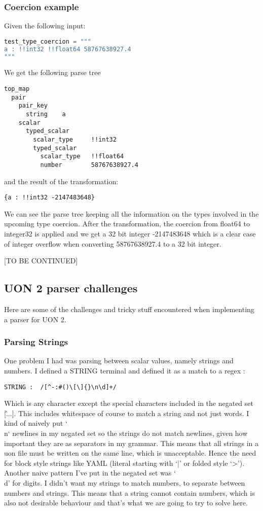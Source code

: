 \documentclass[12pt]{article}
\begin{document}
\subsubsection{Coercion example}
Given the following input:
\begin{lstlisting}[language=Python]
test_type_coercion = """
a : !!int32 !!float64 58767638927.4
"""
\end{lstlisting}

We get the following parse tree
\begin{lstlisting}
top_map
  pair
    pair_key
      string    a
    scalar
      typed_scalar
        scalar_type     !!int32
        typed_scalar
          scalar_type   !!float64
          number        58767638927.4
\end{lstlisting}

and the result of the transformation:
\begin{lstlisting}
{a : !!int32 -2147483648}
\end{lstlisting}
We can see the parse tree keeping all the information on the types involved in the upcoming type coercion. After the transformation, the coercion from float64 to integer32 is applied and we get a 32 bit integer -2147483648 which is a clear case of integer overflow when converting 58767638927.4 to a 32 bit integer.

[TO BE CONTINUED]

\subsection{UON 2 parser challenges}
Here are some of the challenges and tricky stuff encountered when implementing a parser for UON 2.

\subsubsection{Parsing Strings}
One problem I had was parsing between scalar values, namely strings and numbers.
I defined a STRING terminal and defined it as a match to a regex :
\begin{lstlisting}
STRING :  /[^-:#()\[\]{}\n\d]+/
\end{lstlisting}
Which is any character except the special characters included in the negated set [\^...]. This includes whitespace of course to match a string and not just words. I kind of naively put `\\n` newlines in my negated set so the strings do not match newlines, given how important they are as separators in my grammar. This means that all strings in a uon file must be written on the same line, which is unacceptable. Hence the need for block style strings like YAML (literal starting with ‘|’ or folded style ‘>’).
Another naive pattern I’ve put in the negated set was ‘\\d’ for digits. I didn’t want my strings to match numbers, to separate between numbers and strings. This means that a string cannot contain numbers, which is also not desirable behaviour and that’s what we are going to try to solve here.
\end{document}
